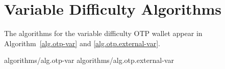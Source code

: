 \section{Variable Difficulty Algorithms}

The algorithms for the variable difficulty OTP wallet
appear in Algorithm~\ref{alg.otp-var} and \ref{alg.otp.external-var}.

{algorithms/alg.otp-var}
{algorithms/alg.otp.external-var}
